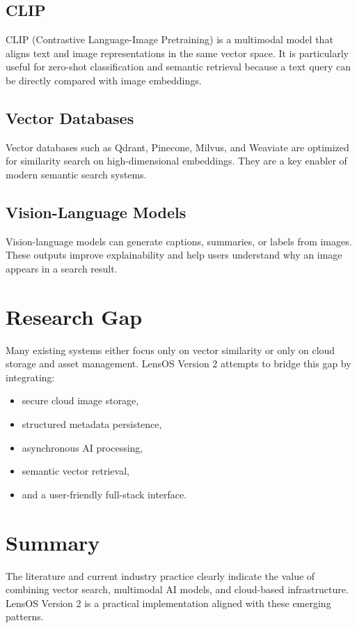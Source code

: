 \documentclass[12pt,a4paper]{report}
\begin{document}
\subsection{CLIP}
CLIP (Contrastive Language-Image Pretraining) is a multimodal model that aligns text and image representations in the same vector space. It is particularly useful for zero-shot classification and semantic retrieval because a text query can be directly compared with image embeddings.

\subsection{Vector Databases}
Vector databases such as Qdrant, Pinecone, Milvus, and Weaviate are optimized for similarity search on high-dimensional embeddings. They are a key enabler of modern semantic search systems.

\subsection{Vision-Language Models}
Vision-language models can generate captions, summaries, or labels from images. These outputs improve explainability and help users understand why an image appears in a search result.

\section{Research Gap}
Many existing systems either focus only on vector similarity or only on cloud storage and asset management. LensOS Version 2 attempts to bridge this gap by integrating:
\begin{itemize}[leftmargin=*]
    \item secure cloud image storage,
    \item structured metadata persistence,
    \item asynchronous AI processing,
    \item semantic vector retrieval,
    \item and a user-friendly full-stack interface.
\end{itemize}

\section{Summary}
The literature and current industry practice clearly indicate the value of combining vector search, multimodal AI models, and cloud-based infrastructure. LensOS Version 2 is a practical implementation aligned with these emerging patterns.
\end{document}
